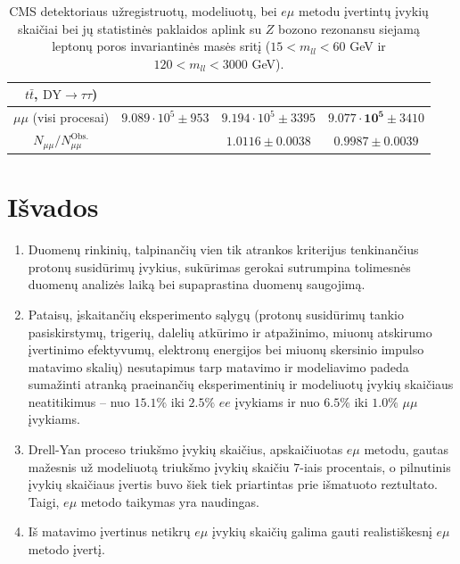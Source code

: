 \documentclass[a4paper, 12pt]{article}
\newcommand{\emu}{e\mu}
\newcommand{\mumu}{\mu\mu}
\newcommand{\DYtau}{\mathrm{DY} \! \rightarrow \! \tau\tau}
\begin{document}
\begin{centering}
\begin{table}
\begin{tabular}{|c|c|c|c|}
	$t\bar{t}$, $\DYtau$) & & & \\
	\hline
	
	\multirow{2}{8em}{\centering $\mumu$ (visi procesai)} &
	\multirow{2}{7em}{\centering $9.089 \cdot 10^5 \pm 953$} &
	\multirow{2}{10em}{\centering $9.194 \cdot 10^5 \pm 3395$}
	&\multirow{2}{10em}{\centering $\mathbf{9.077 \cdot 10^5} \pm 3410$} \\
	
 	& & & \\
	\hline
	
	\multirow{2}{8em}{\centering $N_{\mumu}/N_{\mumu}^{\mathrm{Obs.}}$} &
	\multirow{2}{7em}{\centering 1} &
	\multirow{2}{10em}{\centering $1.0116 \pm 0.0038$} &
	\multirow{2}{10em}{\centering $0.9987 \pm 0.0039$} \\
	
 	& & & \\
	\hline
\end{tabular}
	\caption{\label{table:finalResults_noZ} \small
	CMS detektoriaus užregistruotų, modeliuotų, bei $\emu$ metodu įvertintų įvykių skaičiai bei jų statistinės
	paklaidos aplink su $Z$ bozono rezonansu siejamą leptonų poros invariantinės masės sritį ($15<m_{ll}<60$ GeV
	ir $120<m_{ll}<3000$ GeV).}
\end{table}
\end{centering}


\clearpage
\section*{Išvados} 
\begin{enumerate}
	\item Duomenų rinkinių, talpinančių vien tik atrankos kriterijus tenkinančius protonų susidūrimų įvykius, sukūrimas
	gerokai sutrumpina tolimesnės duomenų analizės laiką bei supaprastina duomenų saugojimą.
	\item Pataisų, įskaitančių eksperimento sąlygų (protonų susidūrimų tankio pasiskirstymų, trigerių, dalelių atkūrimo ir
	atpažinimo, miuonų atskirumo įvertinimo efektyvumų, elektronų energijos bei miuonų skersinio impulso matavimo skalių)
	nesutapimus tarp matavimo ir modeliavimo padeda sumažinti atranką praeinančių eksperimentinių ir modeliuotų įvykių
	skaičiaus neatitikimus -- nuo $15.1\%$ iki $2.5\%$ $ee$ įvykiams ir nuo $6.5\%$ iki $1.0\%$ $\mumu$ įvykiams.
	\item Drell-Yan proceso triukšmo įvykių skaičius, apskaičiuotas $\emu$ metodu, gautas mažesnis už modeliuotą triukšmo
	įvykių skaičiu $7$-iais procentais, o pilnutinis įvykių skaičiaus įvertis buvo šiek tiek priartintas prie išmatuoto
	reztultato. Taigi, $\emu$ metodo taikymas yra naudingas.
	\item Iš matavimo įvertinus netikrų $\emu$ įvykių skaičių galima gauti realistiškesnį $\emu$ metodo įvertį.
\end{enumerate}
\end{document}
